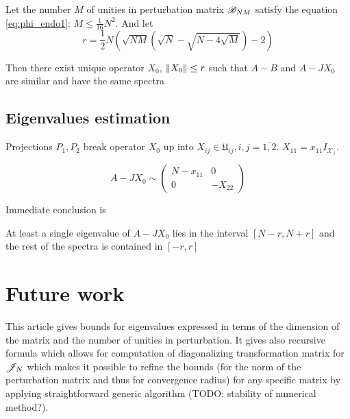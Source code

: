 \documentclass{article}
\begin{document}
\begin{corollary}
    Let the number $M$ of unities in perturbation matrix $\mathscr{B}_{{N}{M}}$
    satisfy the equation \eqref{eq:phi_endo1}: $M \leq \frac{1}{16} N^2$.
    And let
    \[ r = \frac12 N
        \left(
        \sqrt{NM}(\sqrt{N} - \sqrt{N-4\sqrt{M}}) - 2
        \right) \]

    Then there exist unique operator $X_0$, $\left\|{X_0}\right\| \leq r$ such that $A - B$ and $A - J X_0$ are similar
    and have the same spectra
\end{corollary}

\subsection{Eigenvalues estimation}
Projections $P_1, P_2$ break operator $X_0$ up into $X_{ij}\in\mathfrak U_{ij}, i,j=\overline{1,2}$.
$X_{11} = x_{11} I_{\mathcal X_1}$.

\[
    A-JX_0 \sim
    \left(
\begin{array}{c|c}
    N-x_{11} & 0 \\
    \hline
    0        & -X_{22}
\end{array}
\right)
\]

Immediate conclusion is
\begin{lemma}
    At least a single eigenvalue of $A-JX_0$ lies in the interval $\left[N-r,N+r\right]$
    and the rest of the spectra is contained in $\left[-r,r\right]$
\end{lemma}

%

\section{Future work}
This article gives bounds for eigenvalues expressed in terms of the dimension of the matrix and the number of unities in perturbation.
It gives also recursive formula which allows for computation of diagonalizing transformation matrix for $\mathscr{J}_{N}$
which makes it possible to refine the bounds (for the norm of the perturbation matrix and thus for convergence radius)
for any specific matrix by applying straightforward generic algorithm (TODO: stability of numerical method?).
\end{document}
